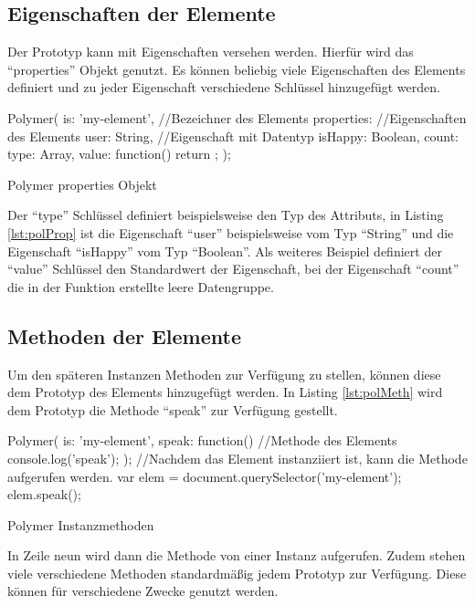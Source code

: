 \documentclass[12pt, paper=a4, bibtotoc, toc=listof, headsepline=true]{scrreprt}
\begin{document}
\subsection{Eigenschaften der Elemente}
Der Prototyp kann mit Eigenschaften versehen werden. Hierfür wird das \enquote{properties} Objekt genutzt. Es können beliebig viele Eigenschaften des Elements definiert und zu jeder Eigenschaft verschiedene Schlüssel hinzugefügt werden.
\begin{listing}[H]
	\begin{JavaScriptcode*}{}
Polymer({
   is: 'my-element', //Bezeichner des Elements
   properties: {  //Eigenschaften des Elements
      user: String, //Eigenschaft mit Datentyp
      isHappy: Boolean,
      count: {
         type: Array,
         value: function() { return {}; }
      }
   }
});
	\end{JavaScriptcode*}
	\caption{Polymer properties Objekt}
	\label{lst:polProp}
\end{listing}
Der \enquote{type} Schlüssel definiert beispielsweise den Typ des Attributs, in Listing \ref{lst:polProp} ist die Eigenschaft \enquote{user} beispielsweise vom Typ \enquote{String} und die Eigenschaft \enquote{isHappy} vom Typ \enquote{Boolean}. Als weiteres Beispiel definiert der \enquote{value} Schlüssel den Standardwert der Eigenschaft, bei der Eigenschaft \enquote{count} die in der Funktion erstellte leere Datengruppe\cite{polyProp}.
\subsection{Methoden der Elemente}
Um den späteren Instanzen Methoden zur Verfügung zu stellen, können diese dem Prototyp des Elements hinzugefügt werden. In Listing \ref{lst:polMeth} wird dem Prototyp die Methode \enquote{speak} zur Verfügung gestellt.
\begin{listing}
	\begin{JavaScriptcode*}{}
Polymer({
   is: 'my-element',
   speak: function(){  //Methode des Elements
   console.log('speak');
   }
});
//Nachdem das Element instanziiert ist, kann die Methode aufgerufen werden.
var elem = document.querySelector('my-element');
elem.speak();
	\end{JavaScriptcode*}
	\caption{Polymer Instanzmethoden}
	\label{lst:polMeth}
\end{listing} In Zeile neun wird dann die Methode von einer Instanz aufgerufen. Zudem stehen viele verschiedene Methoden standardmäßig jedem Prototyp zur Verfügung. Diese können für verschiedene Zwecke genutzt werden\cite{polyInstMeth}.
\end{document}
